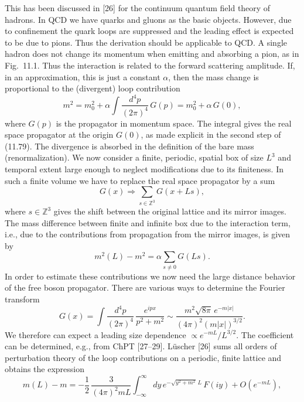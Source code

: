 This has been discussed in [26] for the continuum quantum field theory of
hadrons. In QCD we have quarks and gluons as the basic objects. However,
due to confinement the quark loops are suppressed and the leading effect is
expected to be due to pions. Thus the derivation should be applicable to QCD.
A single hadron does not change its momentum when emitting and absorbing a pion, as in Fig.~11.1. Thus the interaction is related to the forward
scattering amplitude. If, in an approximation, this is just a constant $\alpha$, then
the mass change is proportional to the (divergent) loop contribution
\begin{equation}
m^2 = m_0^2 + \alpha \int \frac{d^4p}{(2\pi)^4}\, G(p) = m_0^2 + \alpha\, G(0) ,
\end{equation}
where $G(p)$ is the propagator in momentum space. The integral gives the real
space propagator at the origin $G(0)$, as made explicit in the second step of
(11.79). The divergence is absorbed in the definition of the bare mass (renormalization).
We now consider a finite, periodic, spatial box of size $L^3$ and temporal
extent large enough to neglect modifications due to its finiteness. In such a
finite volume we have to replace the real space propagator by a sum
\begin{equation}
G(x) \Rightarrow \sum_{s \in \mathbb{Z}^3} G(x + L s) ,
\end{equation}
where $s \in \mathbb{Z}^3$ gives the shift between the original lattice and its mirror images.
The mass difference between finite and infinite box due to the interaction
term, i.e., due to the contributions from propagation from the mirror images,
is given by
\begin{equation}
m^2(L) - m^2 = \alpha \sum_{s \neq 0} G(L s) .
\end{equation}
In order to estimate these contributions we now need the large distance behavior of the free boson propagator. There are various ways to determine the
Fourier transform
\begin{equation}
G(x) = \int \frac{d^4p}{(2\pi)^4}\, \frac{e^{ipx}}{p^2 + m^2}
\sim \frac{m^2 \sqrt{8\pi}\, e^{-m|x|}}{(4\pi)^2 (m|x|)^{3/2}} .
\end{equation}
We therefore can expect a leading size dependence $\propto e^{-mL}/L^{3/2}$. The
coefficient can be determined, e.g., from ChPT [27--29].
L\"uscher [26] sums all orders of perturbation theory of the loop contributions on a periodic, finite lattice and obtains the expression
\begin{equation}
m(L) - m = -\frac{1}{2}\,\frac{3}{(4\pi)^2 mL}
\int_{-\infty}^{\infty} dy\, e^{-\sqrt{y^2 + m^2}\, L}\, F(iy) + O(e^{-mL}) ,
\end{equation}

